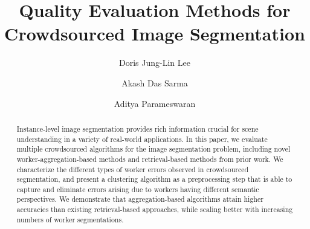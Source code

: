 \documentclass[sigconf]{acmart}
\begin{document}
           \title{Quality Evaluation Methods for Crowdsourced Image Segmentation}
        \author{Doris Jung-Lin Lee}
        \author{Akash Das Sarma}
        \author{Aditya Parameswaran}
           \maketitle
           \vspace{-8pt}
           \begin{abstract}
           \vspace{-7pt}
           Instance-level image segmentation provides rich information crucial for scene understanding in a variety of real-world applications. In this paper, we evaluate multiple crowdsourced algorithms for the image segmentation problem, including novel worker-aggregation-based methods and retrieval-based methods from prior work. We characterize the different types of worker errors observed in crowdsourced segmentation, and present a clustering algorithm as a preprocessing step that is able to capture and eliminate errors arising due to workers having different semantic perspectives. We demonstrate that aggregation-based algorithms attain higher accuracies than existing retrieval-based approaches, while scaling better with increasing numbers of worker segmentations. 
           \vspace{-2pt}
          \end{abstract}
          
          
          
          
          
          
          


\end{document}
